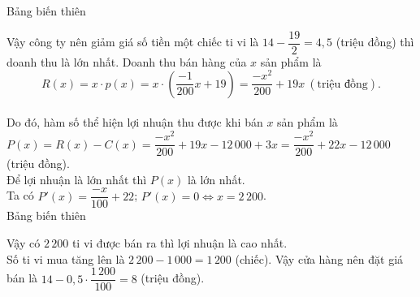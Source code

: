 \begin{ex}
{\begin{itemchoice}
	Bảng biến thiên\\ 
	\begin{center}
	\end{center}
	Vậy công ty nên giảm giá số tiền một chiếc  ti vi là $ 14-\dfrac{19}{2}=4{,}5$ (triệu đồng) thì doanh thu là lớn nhất.
	\itemch Doanh thu bán hàng  của $ x$ sản phẩm là \\
	$$ R(x)=x\cdot p(x)=x\cdot \left(\dfrac{-1}{200}x+19\right)=\dfrac{-x^2}{200}+19x \: (\text {triệu đồng}).$$ \\Do đó, hàm số thể hiện lợi nhuận thu được khi  bán $x$ sản phẩm là\\
	$P(x)=R(x)-C(x)=\dfrac{-x^2}{200}+19x-12\,000+3x=\dfrac{-x^2}{200}+22x-12\,000$ (triệu đồng).\\ 
	Để lợi nhuận là lớn nhất thì $P(x)$ là lớn nhất.\\ Ta có $ P'(x)=\dfrac{-x}{100}+22$;  $P'(x)=0\Leftrightarrow x=2\,200$.\\
	 Bảng biến thiên\\
	\begin{center}
	\end{center}
	 Vậy có $2\,200$ ti vi được bán ra thì lợi nhuận là cao nhất.\\
	Số ti vi mua tăng lên là $  2\,200-1\,000=1\,200$ (chiếc).
	\itemch Vậy cửa hàng nên đặt giá bán là $ 14-0{,}5\cdot\dfrac{1\,200}{100}=8$ (triệu đồng). 
	\end{itemchoice}}
	\end{ex}

